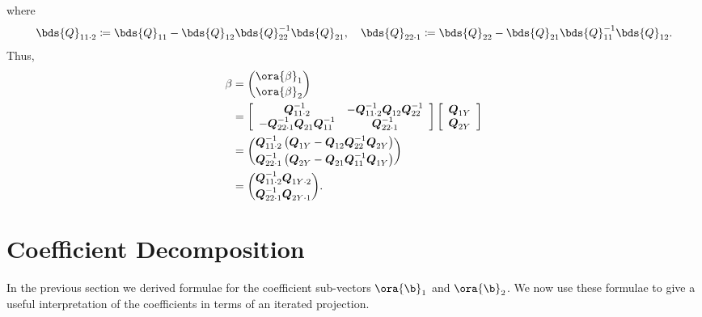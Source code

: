 where 
\begin{equation}
    \notag 
    \bds{Q}_{11 \cdot 2} \coloneqq \bds{Q}_{11} - \bds{Q}_{12} \bds{Q}_{22}^{-1} \bds{Q}_{21}, \quad \bds{Q}_{22 \cdot 1} \coloneqq \bds{Q}_{22} - \bds{Q}_{21} \bds{Q}_{11}^{-1} \bds{Q}_{12}.
\end{equation}
Thus, 
\begin{equation}
    \notag 
    \begin{aligned}
    \beta & =\binom{\ora{\beta}_1}{\ora{\beta}_2} \\
    & =\left[\begin{array}{cc}
    \boldsymbol{Q}_{11 \cdot 2}^{-1} & -\boldsymbol{Q}_{11 \cdot 2}^{-1} \boldsymbol{Q}_{12} \boldsymbol{Q}_{22}^{-1} \\
    -\boldsymbol{Q}_{22 \cdot 1}^{-1} \boldsymbol{Q}_{21} \boldsymbol{Q}_{11}^{-1} & \boldsymbol{Q}_{22 \cdot 1}^{-1}
    \end{array}\right]\left[\begin{array}{c}
    \boldsymbol{Q}_{1 Y} \\
    \boldsymbol{Q}_{2 Y}
    \end{array}\right] \\
    & =\binom{\boldsymbol{Q}_{11 \cdot 2}^{-1}\left(\boldsymbol{Q}_{1 Y}-\boldsymbol{Q}_{12} \boldsymbol{Q}_{22}^{-1} \boldsymbol{Q}_{2 Y}\right)}{\boldsymbol{Q}_{22 \cdot 1}^{-1}\left(\boldsymbol{Q}_{2 Y}-\boldsymbol{Q}_{21} \boldsymbol{Q}_{11}^{-1} \boldsymbol{Q}_{1 Y}\right)} \\
    & =\binom{\boldsymbol{Q}_{11 \cdot 2}^{-1} \boldsymbol{Q}_{1 Y \cdot 2}}{\boldsymbol{Q}_{22 \cdot 1}^{-1} \boldsymbol{Q}_{2 Y \cdot 1}} .
    \end{aligned}
\end{equation}

\section{Coefficient Decomposition}
\setcounter{equation}{43}

In the previous section we derived formulae for the coefficient sub-vectors $\ora{\b}_1$ and $\ora{\b}_2$. We now use these formulae to give a useful interpretation of the coefficients in terms of an iterated projection.

